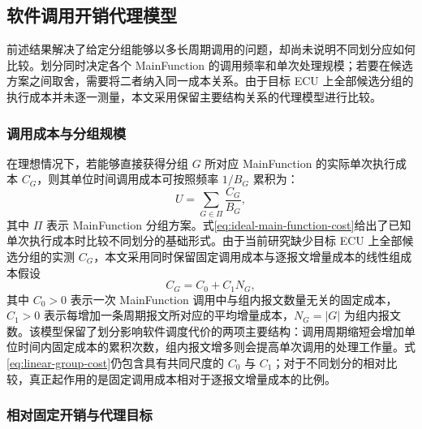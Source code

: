 \documentclass[UTF8,a4paper,twoside,zihao=-4]{ctexart}
\numberwithin{equation}{section}
\numberwithin{figure}{section}
\numberwithin{table}{section}
\theoremstyle{definition}
\numberwithin{algocf}{section}
\begin{document}
\subsection{软件调用开销代理模型}
\label{subsec:cpu-cost-proxy}

前述结果解决了给定分组能够以多长周期调用的问题，却尚未说明不同划分应如何比较。划分同时决定各个 MainFunction 的调用频率和单次处理规模；若要在候选方案之间取舍，需要将二者纳入同一成本关系。由于目标 ECU 上全部候选分组的执行成本并未逐一测量，本文采用保留主要结构关系的代理模型进行比较。

\subsubsection{调用成本与分组规模}
\label{subsubsec:cpu-linear-cost}

在理想情况下，若能够直接获得分组 $G$ 所对应 MainFunction 的实际单次执行成本 $C_G$，则其单位时间调用成本可按照频率 $1/B_G$ 累积为\cite{liu1973}：
\begin{equation}
 U
 =
 \sum_{G\in\Pi}\frac{C_G}{B_G},
\label{eq:ideal-main-function-cost}
\end{equation}
其中 $\Pi$ 表示 MainFunction 分组方案。式\eqref{eq:ideal-main-function-cost}给出了已知单次执行成本时比较不同划分的基础形式。由于当前研究缺少目标 ECU 上全部候选分组的实测 $C_G$，本文采用同时保留固定调用成本与逐报文增量成本的线性组成本假设
\begin{equation}
 C_G
 =
 C_0+C_1N_G,
\label{eq:linear-group-cost}
\end{equation}
其中 $C_0>0$ 表示一次 MainFunction 调用中与组内报文数量无关的固定成本，$C_1>0$ 表示每增加一条周期报文所对应的平均增量成本，$N_G=|G|$ 为组内报文数。该模型保留了划分影响软件调度代价的两项主要结构：调用周期缩短会增加单位时间内固定成本的累积次数，组内报文增多则会提高单次调用的处理工作量。式\eqref{eq:linear-group-cost}仍包含具有共同尺度的 $C_0$ 与 $C_1$；对于不同划分的相对比较，真正起作用的是固定调用成本相对于逐报文增量成本的比例。

\subsubsection{相对固定开销与代理目标}
\label{subsubsec:rho-cpu-proxy}
\end{document}
